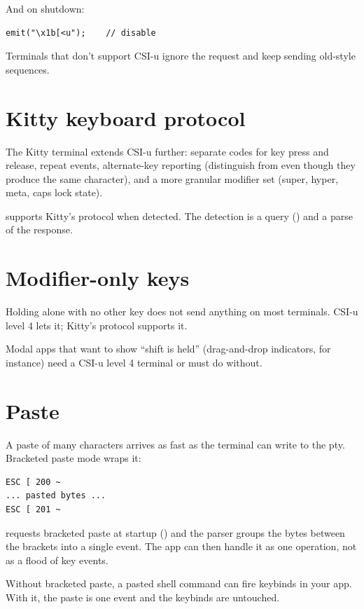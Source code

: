 And on shutdown:

\begin{lstlisting}
emit("\x1b[<u");    // disable
\end{lstlisting}

Terminals that don't support CSI-u ignore the request and keep
sending old-style sequences.

\section{Kitty keyboard protocol}

The Kitty terminal extends CSI-u further: separate codes for
key press and release, repeat events, alternate-key reporting
(distinguish  from  even though they
produce the same character), and a more granular modifier set
(super, hyper, meta, caps lock state).

\maya{} supports Kitty's protocol when detected. The detection
is a query (\code{ESC [ ? u}) and a parse of the response.

\section{Modifier-only keys}

Holding  alone with no other key does not send
anything on most terminals. CSI-u level 4 lets it; Kitty's
protocol supports it.

Modal apps that want to show ``shift is held'' (drag-and-drop
indicators, for instance) need a CSI-u level 4 terminal or
must do without.

\section{Paste}

A paste of many characters arrives as fast as the terminal can
write to the pty. Bracketed paste mode wraps it:

\begin{lstlisting}
ESC [ 200 ~
... pasted bytes ...
ESC [ 201 ~
\end{lstlisting}

\maya{} requests bracketed paste at startup (\code{ESC [ ?
2004 h}) and the parser groups the bytes between the brackets
into a single  event. The app can then handle it
as one operation, not as a flood of key events.

\begin{warning}
Without bracketed paste, a pasted shell command can fire
keybinds in your app. With it, the paste is one event and the
keybinds are untouched.
\end{warning}


